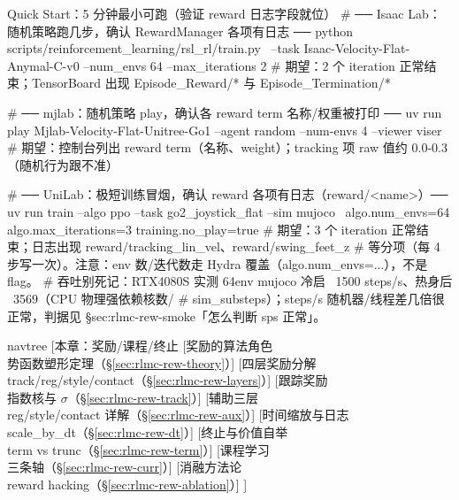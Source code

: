 \begin{codebox}[bash]{Quick Start：5 分钟最小可跑（验证 reward 日志字段就位）}
# ── Isaac Lab：随机策略跑几步，确认 RewardManager 各项有日志 ──
python scripts/reinforcement_learning/rsl_rl/train.py \
  --task Isaac-Velocity-Flat-Anymal-C-v0 --num_envs 64 --max_iterations 2
# 期望：2 个 iteration 正常结束；TensorBoard 出现 Episode_Reward/* 与 Episode_Termination/*

# ── mjlab：随机策略 play，确认各 reward term 名称/权重被打印 ──
uv run play Mjlab-Velocity-Flat-Unitree-Go1 --agent random --num-envs 4 --viewer viser
# 期望：控制台列出 reward term（名称、weight）；tracking 项 raw 值约 0.0-0.3（随机行为跟不准）

# ── UniLab：极短训练冒烟，确认 reward 各项有日志（reward/<name>）──
uv run train --algo ppo --task go2_joystick_flat --sim mujoco \
  algo.num_envs=64 algo.max_iterations=3 training.no_play=true
# 期望：3 个 iteration 正常结束；日志出现 reward/tracking_lin_vel、reward/swing_feet_z
#   等分项（每 4 步写一次）。注意：env 数/迭代数走 Hydra 覆盖（algo.num_envs=...），不是 flag。
# 吞吐别死记：RTX4080S 实测 64env mujoco 冷启 ~1500 steps/s、热身后 ~3569（CPU 物理强依赖核数/
#   sim_substeps）；steps/s 随机器/线程差几倍很正常，判据见 §sec:rlmc-rew-smoke「怎么判断 sps 正常」。
\end{codebox}

\begin{center}
\begin{forest} navtree
[{本章：奖励/课程/终止}
  [{奖励的算法角色\\势函数塑形定理（\S\ref{sec:rlmc-rew-theory}）}]
  [{四层奖励分解\\track/reg/style/contact（\S\ref{sec:rlmc-rew-layers}）}]
  [{跟踪奖励\\指数核与 $\sigma$（\S\ref{sec:rlmc-rew-track}）}]
  [{辅助三层\\reg/style/contact 详解（\S\ref{sec:rlmc-rew-aux}）}]
  [{时间缩放与日志\\scale\_by\_dt（\S\ref{sec:rlmc-rew-dt}）}]
  [{终止与价值自举\\term vs trunc（\S\ref{sec:rlmc-rew-term}）}]
  [{课程学习\\三条轴（\S\ref{sec:rlmc-rew-curr}）}]
  [{消融方法论\\reward hacking（\S\ref{sec:rlmc-rew-ablation}）}]
]
\end{forest}
\end{center}

